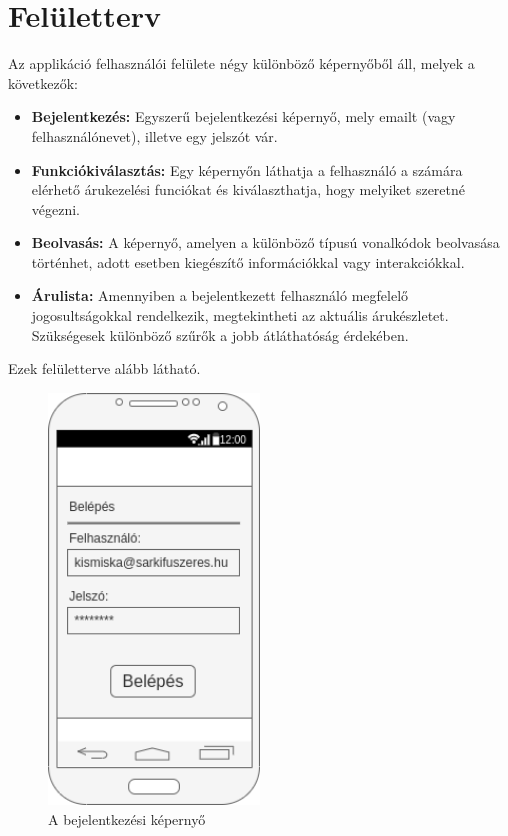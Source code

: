 \documentclass[12pt,a4paper]{article}
\begin{document}
	\section{Felületterv}
	Az applikáció felhasználói felülete négy különböző képernyőből áll, melyek a következők:
	\begin{itemize}
		\item \textbf{Bejelentkezés:} Egyszerű bejelentkezési képernyő, mely emailt (vagy felhasználónevet), illetve egy jelszót vár.
		\item \textbf{Funkciókiválasztás:} Egy képernyőn láthatja a felhasználó a számára elérhető árukezelési funciókat és kiválaszthatja, hogy melyiket szeretné végezni.
		\item \textbf{Beolvasás:} A képernyő, amelyen a különböző típusú vonalkódok beolvasása történhet, adott esetben kiegészítő információkkal vagy interakciókkal.
		\item \textbf{Árulista:} Amennyiben a bejelentkezett felhasználó megfelelő jogosultságokkal rendelkezik, megtekintheti az aktuális árukészletet. Szükségesek különböző szűrők a jobb átláthatóság érdekében.
	\end{itemize}
	Ezek felületterve alább látható.
	\begin{figure}[H]
		\centering
		\includegraphics[width=0.5\textwidth]{img/login.png}
		\caption{A bejelentkezési képernyő}
		\label{fig:login}
	\end{figure}
\end{document}
